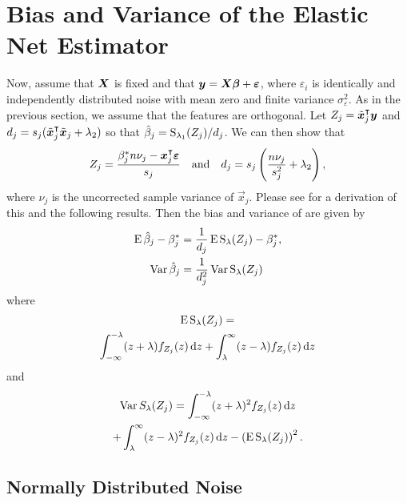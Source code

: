 \section{Bias and Variance of the Elastic Net Estimator}\label{sec:theory}

Now, assume that \(\boldsymbol{X}\) is fixed and that \(\boldsymbol{y} = \boldsymbol{X}\boldsymbol{\beta} +
\boldsymbol{\varepsilon}\), where \(\varepsilon_i\) is identically and independently distributed
noise with mean zero and finite variance \(\sigma_\varepsilon^2\). As in the previous
section, we assume that the features are orthogonal. Let \({Z_j} = \tilde{\boldsymbol{x}}_j^\intercal
\boldsymbol{y}\) and \(d_j = s_j(\tilde{\boldsymbol{x}}_j^\intercal \tilde{\boldsymbol{x}}_j + \lambda_2)\) so that
\(\hat{\beta}_j = \operatorname{S}_{\lambda_1}({Z_j})/d_j\). We can then show that
\begin{equation}
  \label{eq:z-d}
  {Z_j} = \frac{\beta_j^* n \nu_j- \boldsymbol{x}_j^\intercal \boldsymbol{\varepsilon}}{s_j}
  \quad\text{and}\quad
  d_j = s_j\left(\frac{n \nu_j}{s_j^2} + \lambda_2\right),
\end{equation}
where \(\nu_j\) is the uncorrected sample variance of \(\vec{x}_j\). Please see
 for a derivation of this and the following results.
Then the bias and variance of  are given by
\begin{align*}
  \operatorname{E} \hat\beta_j - \beta_j^* & = \frac{1}{d_j}\operatorname{E} \operatorname{S}_\lambda({Z_j}) - \beta^*_j, \\
  \operatorname{Var} \hat\beta_j           & = \frac{1}{d_j^2} \operatorname{Var} \operatorname{S}_\lambda({Z_j})
\end{align*}
where
\begin{multline*}
  \operatorname{E} \operatorname{S}_\lambda({Z_j}) = \\
  \int_{-\infty}^{-\lambda}(z + \lambda)f_{Z_j}(z) \mathop{}\!\mathrm{d} z + \int_{\lambda}^\infty (z - \lambda)f_{Z_j}(z) \mathop{}\!\mathrm{d} z
\end{multline*}
and
\begin{multline}
  \label{eq:st-variance}
  \operatorname{Var} {S_\lambda({Z_j})} = \int_{-\infty}^{-\lambda}(z + \lambda)^2f_{Z_j}(z) \mathop{}\!\mathrm{d} z \\
  + \int_{\lambda}^\infty (z - \lambda)^2 f_{Z_j}(z) \mathop{}\!\mathrm{d} z - \left(\operatorname{E} \operatorname{S}_\lambda({Z_j})\right)^2.
\end{multline}

\subsection{Normally Distributed Noise}


